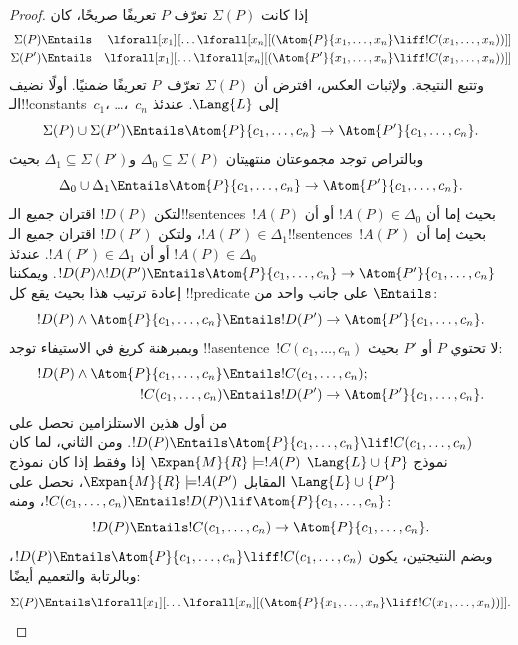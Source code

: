 \documentclass[../../../include/open-logic-section]{subfiles}
\begin{document}
\begin{proof}
إذا كانت $\Sigma(P)$ تعرّف $P$ تعريفًا صريحًا، كان
\begin{align*}
  \Sigma(P) & \Entails & \lforall[x_1][\dots \lforall[x_n]
    [(\Atom{P}{x_1,\dots, x_n} \liff !C(x_1,\dots,x_n))]]\\
  \Sigma(P') & \Entails & \lforall[x_1][\dots \lforall[x_n]
    [(\Atom{P'}{x_1,\dots, x_n} \liff !C(x_1,\dots,x_n))]]
\end{align*}
وتتبع النتيجة. ولإثبات العكس، افترض أن $\Sigma(P)$ تعرّف~$P$ تعريفًا
ضمنيًا. أولًا نضيف الـ!!{constant}s~$c_1$، \dots،~$c_n$ إلى
$\Lang{L}$. عندئذ
\[
\Sigma(P) \cup \Sigma(P') \Entails
\Atom{P}{c_1, \dots, c_n} \to \Atom{P'}{c_1, \dots, c_n}.
\]
وبالتراص توجد مجموعتان منتهيتان
$\Delta_0 \subseteq \Sigma(P)$ و$\Delta_1 \subseteq \Sigma(P')$ بحيث
\[
\Delta_0 \cup \Delta_1 \Entails
\Atom{P}{c_1, \dots, c_n} \to \Atom{P'}{c_1, \dots, c_n}.
\]
لتكن $!D(P)$ اقتران جميع الـ!!{sentence}s~$!A(P)$ بحيث إما أن
$!A(P) \in \Delta_0$ أو أن $!A(P') \in \Delta_1$، ولتكن $!D(P')$
اقتران جميع الـ!!{sentence}s~$!A(P')$ بحيث إما أن
$!A(P) \in \Delta_0$ أو أن $!A(P') \in \Delta_1$. عندئذ
$!D(P) \land !D(P') \Entails \Atom{P}{c_1,\dots,c_n} \to
\Atom{P'}{c_1,\dots,c_n}$. ويمكننا إعادة ترتيب هذا بحيث يقع كل
!!{predicate} على جانب واحد من $\Entails$:
\[
!D(P) \land \Atom{P}{c_1, \dots, c_n} \Entails
!D(P') \to \Atom{P'}{c_1, \dots, c_n}.
\]
وبمبرهنة كريغ في الاستيفاء توجد !!a{sentence}~$!C(c_1,\dots,c_n)$ لا
تحتوي $P$ أو $P'$ بحيث:
\begin{align*}
  !D(P) \land \Atom{P}{c_1, \dots, c_n} & \Entails !C(c_1,\dots, c_n); \\
  !C(c_1,\dots, c_n) & \Entails !D(P') \to \Atom{P'}{c_1, \dots, c_n}.
\end{align*}
من أول هذين الاستلزامين نحصل على
$!D(P) \Entails \Atom{P}{c_1,\dots,c_n} \lif !C(c_1,\dots,c_n)$.
ومن الثاني، لما كان نموذج $\Lang{L} \cup \{P\}$
$\Expan{M}{R} \models !A(P)$ إذا وفقط إذا كان نموذج
$\Lang{L} \cup \{P'\}$ المقابل $\Expan{M}{R} \models !A(P')$، نحصل
على $!C(c_1,\dots,c_n) \Entails !D(P) \lif
\Atom{P}{c_1,\dots,c_n}$، ومنه:
\[
!D(P) \Entails !C(c_1,\dots,c_n) \to \Atom{P}{c_1,\dots, c_n}.
\]
وبضم النتيجتين، يكون
$!D(P) \Entails \Atom{P}{c_1,\dots,c_n} \liff
!C(c_1,\dots,c_n)$، وبالرتابة والتعميم أيضًا:
\[
\Sigma(P) \Entails
\lforall[x_1][\dots\lforall[x_n][(\Atom{P}{x_1,\dots, x_n} \liff
    !C(x_1,\dots, x_n))]].
\]
\end{proof}
\end{document}
